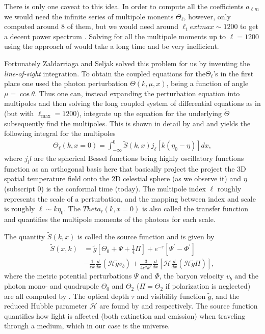 \documentclass[twocolumn]{aastex62}
\begin{document}
There is only one caveat to this idea. In order to compute all the coefficients $a_{\ell m}$ we would need the infinite series of multipole monents $\Theta_\ell$, however, \cite{stutzer:2020c} only computed around 8 of them, but we would need around $\ell_text{max} \sim 1200$ to get a decent power spectrum \citep[]{winther:2020c}. Solving for all the multipole moments up to $\ell = 1200$ using the approach of \cite{stutzer:2020c} would take a long time and be very inefficient. 

Fortunately Zaldarriaga and Seljak solved this problem for us by inventing the \textit{line-of-sight} integration. To obtain the coupled equations for the$ \Theta_\ell$'s in the first place one used the photon perturbation $\Theta(k, \mu, x)$, being a function of angle $\mu = \cos \theta$. Thus one can, instead expanding the perturbation equation into multipoles and then solving the long coupled system of differential equations as in \cite{stutzer:2020c} (but with $\ell_\text{max} = 1200$), integrate up the equation for the underlying $\dot{\Theta}$ subsequently find the multipoles. This is shown in detail by \cite{callin:2006} and \cite{dodelson:2003} and yields the following integral for the multipoles 
\begin{align}
    \Theta_\ell(k, x=0) = \int_{-\infty}^{0} \tilde{S}(k,x)
              j_\ell[k(\eta_0-\eta)] dx,
    \label{eq:transfer}
\end{align} 
where $j_ll$ are the spherical Bessel functions being highly oscillatory functions function as an orthogonal basis here that basically project the project the 3D spatial temperature field onto the 2D celestial sphere (as we observe it) and $\eta$ (subscript 0) is the conformal time (today). The multipole index $\ell$ roughly represents the scale of a perturbation, and the mapping between index and scale is roughly $\ell\sim k\eta_0$. The $Theta_\ell(k, x = 0)$ is also called the transfer function and quantifies the multipole moments of the photons for each scale.

The quantity $\tilde{S}(k,x)$ is called the source function and is given by
\begin{align}
    \tilde{S}(x, k) &= \tilde{g}\left[ \Theta_0 + \Psi + \frac{1}{4}\Pi\right] + e^{-\tau} \left[\Psi^\prime-\Phi^\prime\right] \nonumber\\
    &- \frac{1}{ck}\frac{d}{dx}(\mathcal{H}\tilde{g}v_b) + \frac{3}{4c^2k^2} \frac{d}{dx} \left[\mathcal{H}\frac{d}{dx} (\mathcal{H}\tilde{g}\Pi)\right],
    \label{eq:source}
\end{align}
where the metric potential perturbations $\Psi$ and $\Phi$, the baryon velocity $v_b$ and the photon mono- and quadrupole $\Theta_0$ and $\Theta_2$ ($\Pi = \Theta_2$ if polarization is neglected) are all computed by \cite{stutzer:2020c}. The optical depth $\tau$ and visibility function $\tilde{g}$, and the reduced Hubble parameter $\mathcal{H}$ are found by \cite{stutzer:2020b} and \cite{stutzer:2020a} respectively. The source function quantifies how light is affected (both extinction and emission) when traveling through a medium, which in our case is the universe.
\end{document}
